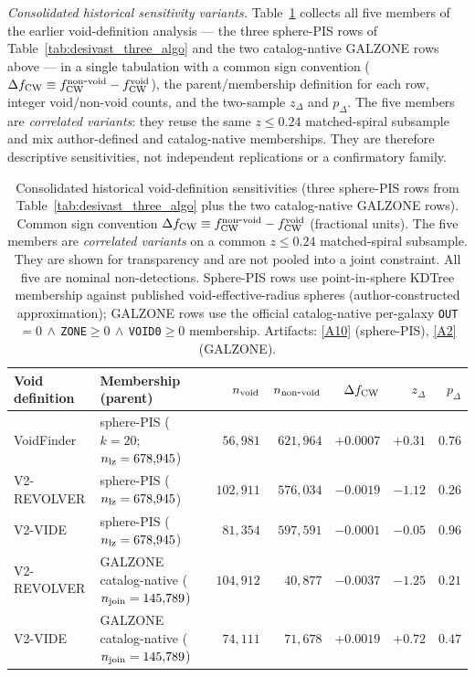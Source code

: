\documentclass[twocolumn,linenumbers]{aastex702}
\newcommand{\repoBase}{https://github.com/Hubify-Projects/bigbounce/blob/main}
\begin{document}
\emph{Consolidated historical sensitivity variants.}
Table~\ref{tab:bonferroni5_family} collects all five members of the
earlier void-definition analysis --- the three sphere-PIS rows of
Table~\ref{tab:desivast_three_algo} and the two catalog-native GALZONE
rows above --- in a single tabulation with a common sign convention
($\Delta f_{\rm CW} \equiv f_{\rm CW}^{\rm non\mbox{-}void} -
f_{\rm CW}^{\rm void}$), the parent/membership definition for each row,
integer void/non-void counts, and the two-sample $z_\Delta$ and
$p_\Delta$. The five members are \emph{correlated variants}: they reuse
the same $z\!\le\!0.24$ matched-spiral subsample and mix author-defined
and catalog-native memberships. They are therefore descriptive
sensitivities, not independent replications or a confirmatory family.

\begin{table}[ht]
\caption{Consolidated historical void-definition sensitivities
(three sphere-PIS rows from Table~\ref{tab:desivast_three_algo} plus the
two catalog-native GALZONE rows). Common sign convention
$\Delta f_{\rm CW} \equiv f_{\rm CW}^{\rm non\mbox{-}void} -
f_{\rm CW}^{\rm void}$ (fractional units). The five members are
\emph{correlated variants} on a common $z\!\le\!0.24$ matched-spiral
subsample. They are shown for transparency and are not pooled into a
joint constraint. All five are nominal non-detections. Sphere-PIS
rows use point-in-sphere KDTree membership against published
void-effective-radius spheres (author-constructed approximation);
GALZONE rows use the official catalog-native per-galaxy
\texttt{OUT}$=0\,\wedge\,$\texttt{ZONE}$\ge0\,\wedge\,$\texttt{VOID0}$\ge0$
membership. Artifacts:
\href{\repoBase/pipelines/p5\_desi\_chirality/outputs/17\_v0151\_closure\_recomputes.json}{[A10]}
(sphere-PIS),
\href{\repoBase/pipelines/p5\_desi\_chirality/outputs/30\_ext4\_galzone\_complement\_contrasts.json}{[A2]}
(GALZONE).}
\label{tab:bonferroni5_family}
\begin{ruledtabular}
\begin{tabular}{llrrrrr}
Void definition & Membership (parent) & $n_{\rm void}$ &
$n_{\rm non\mbox{-}void}$ & $\Delta f_{\rm CW}$ & $z_\Delta$ &
$p_\Delta$ \\
\hline
VoidFinder & sphere-PIS ($k\!=\!20$; $n_{\rm lz}=678{,}945$) & $56{,}981$ & $621{,}964$ & $+0.0007$ & $+0.31$ & $0.76$ \\
V2-REVOLVER & sphere-PIS ($n_{\rm lz}=678{,}945$) & $102{,}911$ & $576{,}034$ & $-0.0019$ & $-1.12$ & $0.26$ \\
V2-VIDE & sphere-PIS ($n_{\rm lz}=678{,}945$) & $81{,}354$ & $597{,}591$ & $-0.0001$ & $-0.05$ & $0.96$ \\
V2-REVOLVER & GALZONE catalog-native ($n_{\rm join}=145{,}789$) & $104{,}912$ & $40{,}877$ & $-0.0037$ & $-1.25$ & $0.21$ \\
V2-VIDE & GALZONE catalog-native ($n_{\rm join}=145{,}789$) & $74{,}111$ & $71{,}678$ & $+0.0019$ & $+0.72$ & $0.47$ \\
\end{tabular}
\end{ruledtabular}
\end{table}
\end{document}
